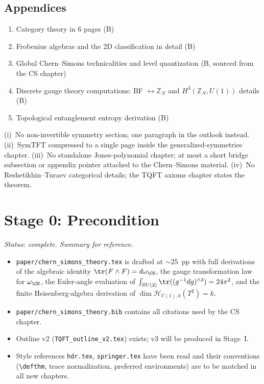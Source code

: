 \documentclass[11pt]{article}
\begin{document}
\subsection{Appendices}

\begin{enumerate}[label=\Alph*.,leftmargin=2em]
\item Category theory in 6 pages (B)
\item Frobenius algebras and the 2D classification in detail (B)
\item Global Chern--Simons technicalities and level quantization (B, sourced from the CS chapter)
\item Discrete gauge theory computations: BF $\leftrightarrow \mathbb{Z}_N$ and
$H^3(\mathbb{Z}_N,U(1))$ details (B)
\item Topological entanglement entropy derivation (B)
\end{enumerate}

\begin{insight}
(i)~No non-invertible symmetry section; one paragraph in the outlook instead.
(ii)~SymTFT compressed to a single page inside the generalized-symmetries chapter.
(iii)~No standalone Jones-polynomial chapter; at most a short bridge subsection or appendix
pointer attached to the Chern--Simons material.
(iv)~No Reshetikhin--Turaev categorical details; the TQFT axioms chapter states the theorem.
\end{insight}

\section{Stage 0: Precondition}\label{sec:stage0}

\noindent\textit{Status: complete. Summary for reference.}

\begin{itemize}
\item \texttt{paper/chern\_simons\_theory.tex} is drafted at $\sim 25$~pp with full
derivations of the algebraic identity $\tr(F\wedge F)=d\omega_{\CS}$, the gauge transformation
law for $\omega_{\CS}$, the Euler-angle evaluation of $\int_{SU(2)}\tr((g^{-1}dg)^{\wedge 3})=24\pi^2$,
and the finite Heisenberg-algebra derivation of $\dim\mathcal{H}_{U(1),k}(T^2)=k$.
\item \texttt{paper/chern\_simons\_theory.bib} contains all citations used by the CS chapter.
\item Outline v2 (\texttt{TQFT\_outline\_v2.tex}) exists; v3 will be produced in Stage~I.
\item Style references \texttt{hdr.tex}, \texttt{springer.tex} have been read and their
conventions (\texttt{\textbackslash defthm}, trace normalization, preferred environments)
are to be matched in all new chapters.
\end{itemize}
\end{document}
